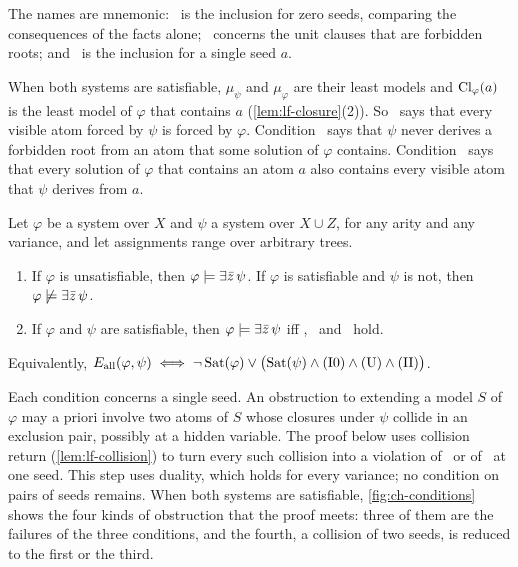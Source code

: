 The names are mnemonic: \CondI\ is the inclusion for zero seeds, comparing the
consequences of the facts alone; \CondU\ concerns the unit clauses that are
forbidden roots; and \CondII\ is the inclusion for a single seed $a$.

When both systems are satisfiable, $\mu_\psi$ and $\mu_\varphi$ are their
least models and $\operatorname{Cl}_\varphi(a)$ is the least model of $\varphi$ that
contains $a$ (\cref{lem:lf-closure}(2)). So \CondI\ says that every visible
atom forced by $\psi$ is forced by $\varphi$. Condition \CondU\ says that
$\psi$ never derives a forbidden root from an atom that some solution of
$\varphi$ contains. Condition \CondII\ says that every solution of $\varphi$
that contains an atom $a$ also contains every visible atom that $\psi$
derives from $a$.

\begin{theorem}[Characterization]\label{thm:ch-characterization}
Let $\varphi$ be a system over $X$ and $\psi$ a system over $X\cup Z$, for
any arity and any variance, and let assignments range over arbitrary trees.
\begin{enumerate}[leftmargin=*]
\item If $\varphi$ is unsatisfiable, then $\varphi\models\exists\bar z\,\psi$. If
  $\varphi$ is satisfiable and $\psi$ is not, then
  $\varphi\not\models\exists\bar z\,\psi$.
\item If $\varphi$ and $\psi$ are satisfiable, then
  $\varphi\models\exists\bar z\,\psi$ iff \CondI, \CondU\ and \CondII\ hold.
\end{enumerate}
Equivalently, $E_{\mathrm{all}}(\varphi,\psi)\iff\neg\operatorname{Sat}(\varphi)\lor
\bigl(\operatorname{Sat}(\psi)\land\textup{(I0)}\land\textup{(U)}\land\textup{(II)}\bigr)$.
\end{theorem}

Each condition concerns a single seed. An obstruction to extending a model
$S$ of $\varphi$ may a priori involve two atoms of $S$ whose closures under
$\psi$ collide in an exclusion pair, possibly at a hidden variable. The
proof below uses collision return (\cref{lem:lf-collision}) to turn every
such collision into a violation of \CondI\ or of \CondII\ at one seed. This
step uses duality, which holds for every variance; no condition on pairs of
seeds remains. When both systems are satisfiable, \cref{fig:ch-conditions}
shows the four kinds of obstruction that the proof meets: three of them are the failures of the three
conditions, and the fourth, a collision of two seeds, is reduced to the
first or the third.



